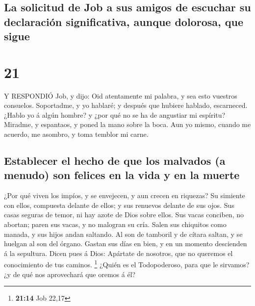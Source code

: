 \hypertarget{la-solicitud-de-job-a-sus-amigos-de-escuchar-su-declaraciuxf3n-significativa-aunque-dolorosa-que-sigue}{%
\subsection{La solicitud de Job a sus amigos de escuchar su declaración
significativa, aunque dolorosa, que
sigue}\label{la-solicitud-de-job-a-sus-amigos-de-escuchar-su-declaraciuxf3n-significativa-aunque-dolorosa-que-sigue}}

\hypertarget{section-20}{%
\section{21}\label{section-20}}

 Y RESPONDIÓ Job, y dijo:  Oid atentamente mi
palabra, y sea esto vuestros consuelos.  Soportadme, y yo
hablaré; y después que hubiere hablado, escarneced.  ¿Hablo
yo á algún hombre? y ¿por qué no se ha de angustiar mi espíritu?
 Miradme, y espantaos, y poned la mano sobre la boca.
 Aun yo mismo, cuando me acuerdo, me asombro, y toma temblor
mi carne.

\hypertarget{establecer-el-hecho-de-que-los-malvados-a-menudo-son-felices-en-la-vida-y-en-la-muerte}{%
\subsection{Establecer el hecho de que los malvados (a menudo) son
felices en la vida y en la
muerte}\label{establecer-el-hecho-de-que-los-malvados-a-menudo-son-felices-en-la-vida-y-en-la-muerte}}

 ¿Por qué viven los impíos, y se envejecen, y aun crecen en
riquezas?  Su simiente con ellos, compuesta delante de
ellos; y sus renuevos delante de sus ojos.  Sus casas
seguras de temor, ni hay azote de Dios sobre ellos.  Sus
vacas conciben, no abortan; paren sus vacas, y no malogran su cría.
 Salen sus chiquitos como manada, y sus hijos andan
saltando.  Al son de tamboril y de cítara saltan, y se
huelgan al son del órgano.  Gastan sus días en bien, y en
un momento descienden á la sepultura.  Dicen pues á Dios:
Apártate de nosotros, que no queremos el conocimiento de tus caminos.
\footnote{\textbf{21:14} Job 22,17}  ¿Quién es el
Todopoderoso, para que le sirvamos? ¿y de qué nos aprovechará que oremos
á él?

